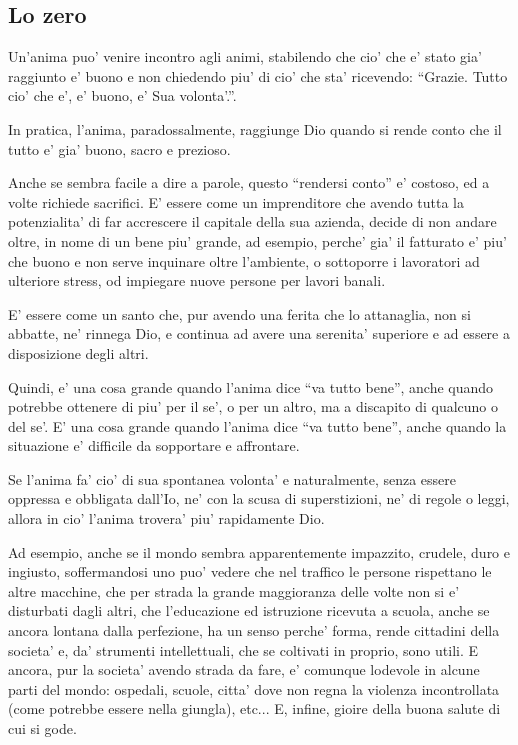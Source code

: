 \subsection{Lo zero}
\label{loZero}
Un'anima puo' venire incontro agli animi, stabilendo che cio' che e' stato gia' raggiunto e' buono e non chiedendo piu' di cio' che sta' ricevendo: ``Grazie. Tutto cio' che e', e' buono, e' Sua volonta'.''.

In pratica, l'anima, paradossalmente, raggiunge Dio quando si rende conto che il tutto e' gia' buono, sacro e prezioso.

Anche se sembra facile a dire a parole, questo ``rendersi conto'' e' costoso, ed a volte richiede sacrifici. E' essere come un imprenditore che avendo tutta la potenzialita' di far accrescere il capitale della sua azienda, decide di non andare oltre, in nome di un bene piu' grande, ad esempio, perche' gia' il fatturato e' piu' che buono e non serve inquinare oltre l'ambiente, o sottoporre i lavoratori ad ulteriore stress, od impiegare nuove persone per lavori banali.

E' essere come un santo che, pur avendo una ferita che lo attanaglia, non si abbatte, ne' rinnega Dio, e continua ad avere una serenita' superiore e ad essere a disposizione degli altri.

Quindi, e' una cosa grande quando l'anima dice ``va tutto bene'', anche quando potrebbe ottenere di piu' per il se', o per un altro, ma a discapito di qualcuno o del se'. E' una cosa grande quando l'anima dice ``va tutto bene'', anche quando la situazione e' difficile da sopportare e affrontare.

Se l'anima fa' cio' di sua spontanea volonta' e naturalmente, senza essere oppressa e obbligata dall'Io, ne' con la scusa di superstizioni, ne' di regole o leggi, allora in cio' l'anima trovera' piu' rapidamente Dio.

Ad esempio, anche se il mondo sembra apparentemente impazzito, crudele, duro e ingiusto, soffermandosi uno puo' vedere che nel traffico le persone rispettano le altre macchine, che per strada la grande maggioranza delle volte non si e' disturbati dagli altri, che l'educazione ed istruzione ricevuta a scuola, anche se ancora lontana dalla perfezione, ha un senso perche' forma, rende cittadini della societa' e, da' strumenti intellettuali, che se coltivati in proprio, sono utili. E ancora, pur la societa' avendo strada da fare, e' comunque lodevole in alcune parti del mondo: ospedali, scuole, citta' dove non regna la violenza incontrollata (come potrebbe essere nella giungla), etc... E, infine, gioire della buona salute di cui si gode.

